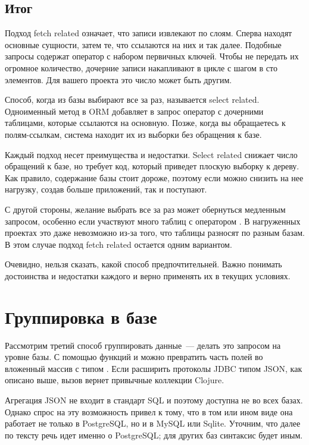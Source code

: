 \subsection{Итог}

Подход fetch related означает, что записи извлекают по слоям. Сперва находят основные сущности, затем те, что ссылаются на них и так далее. Подобные запросы содержат оператор  с набором первичных ключей. Чтобы не передать их огромное количество, дочерние записи накапливают в цикле с шагом в сто элементов. Для вашего проекта это число может быть другим.

Способ, когда из базы выбирают все за раз, называется select related. Одноименный метод в ORM добавляет в запрос оператор  с дочерними таблицами, которые ссылаются на основную. Позже, когда вы обращаетесь к полям-ссылкам, система находит их из выборки без обращения к базе.

Каждый подход несет преимущества и недостатки. Select related снижает число обращений к базе, но требует код, который приведет плоскую выборку к дереву. Как правило, содержание базы стоит дороже, поэтому если можно снизить на нее нагрузку, создав больше приложений, так и поступают.

С другой стороны, желание выбрать все за раз может обернуться медленным запросом, особенно если участвуют много таблиц с оператором . В нагруженных проектах это даже невозможно из-за того, что таблицы разносят по разным базам. В этом случае подход fetch related остается одним вариантом.

Очевидно, нельзя сказать, какой способ предпочтительней. Важно понимать достоинства и недостатки каждого и верно применять их в текущих условиях.

\section{Группировка в базе}

Рассмотрим третий способ группировать данные~--- делать это запросом на уровне базы. С помощью функций  и  можно превратить часть полей во вложенный массив с типом . Если расширить протоколы JDBC типом JSON, как описано выше, вызов  вернет привычные коллекции Clojure.

Агрегация JSON не входит в стандарт SQL и поэтому доступна не во всех базах. Однако спрос на эту возможность привел к тому, что в том или ином виде она работает не только в PostgreSQL, но и в MySQL или Sqlite. Уточним, что далее по тексту речь идет именно о PostgreSQL; для других баз синтаксис будет иным.

